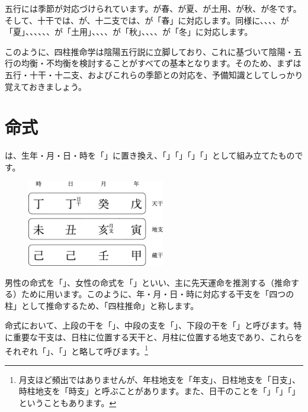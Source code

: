 \documentclass[a5paper,11pt,dvipdfmx]{tarticle}
\begin{document}
五行には季節が対応づけられています。が春、が夏、が土用、が秋、が冬です。そして、十干では、が、十二支では、が「春」に対応します。同様に、、、、が「夏」、、、、、、が「土用」、、、、が「秋」、、、、が「冬」に対応します。

このように、四柱推命学は陰陽五行説に立脚しており、これに基づいて陰陽・五行の均衡・不均衡を検討することがすべての基本となります。そのため、まずは五行・十干・十二支、およびこれらの季節との対応を、予備知識としてしっかり覚えておきましょう。


\clearpage

\section{命式}

は、生年・月・日・時を「」に置き換え、「」「」「」「」として組み立てたものです。

\begin{figure}
  \includegraphics[width=60mm,angle=90]{figs/figure3-1.eps}
\end{figure}

男性の命式を「」、女性の命式を「」といい、主に先天運命を推測する（推命する）ために用います。このように、年・月・日・時に対応する干支を「四つの柱」として推命するため、「四柱推命」と称します。

命式において、上段の干を「」、中段の支を「」、下段の干を「」と呼びます。特に重要な干支は、日柱に位置する天干と、月柱に位置する地支であり、これらをそれぞれ「」、「」と略して呼びます。\footnote{月支ほど頻出ではありませんが、年柱地支を「年支」、日柱地支を「日支」、時柱地支を「時支」と呼ぶことがあります。また、日干のことを「」「」「」ということもあります。}
\end{document}
